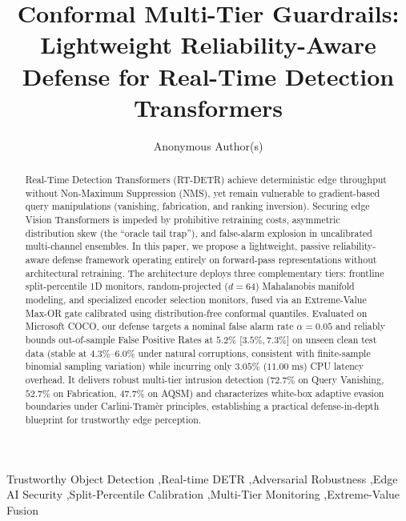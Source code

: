\documentclass[preprint,12pt]{elsarticle}
\begin{document}
\begin{frontmatter}

\title{\textbf{Conformal Multi-Tier Guardrails: Lightweight Reliability-Aware Defense for Real-Time Detection Transformers}}

\author{Anonymous Author(s)}

\begin{abstract}
Real-Time Detection Transformers (RT-DETR) achieve deterministic edge throughput without Non-Maximum Suppression (NMS), yet remain vulnerable to gradient-based query manipulations (vanishing, fabrication, and ranking inversion). Securing edge Vision Transformers is impeded by prohibitive retraining costs, asymmetric distribution skew (the ``oracle tail trap''), and false-alarm explosion in uncalibrated multi-channel ensembles. In this paper, we propose a lightweight, passive reliability-aware defense framework operating entirely on forward-pass representations without architectural retraining. The architecture deploys three complementary tiers: frontline split-percentile 1D monitors, random-projected ($d=64$) Mahalanobis manifold modeling, and specialized encoder selection monitors, fused via an Extreme-Value Max-OR gate calibrated using distribution-free conformal quantiles. Evaluated on Microsoft COCO, our defense targets a nominal false alarm rate $\alpha=0.05$ and reliably bounds out-of-sample False Positive Rates at $5.2\%$ [$3.5\%, 7.3\%$] on unseen clean test data (stable at $4.3\%$--$6.0\%$ under natural corruptions, consistent with finite-sample binomial sampling variation) while incurring only $3.05\%$ ($11.00\text{ ms}$) CPU latency overhead. It delivers robust multi-tier intrusion detection ($72.7\%$ on Query Vanishing, $52.7\%$ on Fabrication, $47.7\%$ on AQSM) and characterizes white-box adaptive evasion boundaries under Carlini-Tramèr principles, establishing a practical defense-in-depth blueprint for trustworthy edge perception.
\end{abstract}

\begin{keyword}
Trustworthy Object Detection \sep Real-time DETR \sep Adversarial Robustness \sep Edge AI Security \sep Split-Percentile Calibration \sep Multi-Tier Monitoring \sep Extreme-Value Fusion
\end{keyword}

\end{frontmatter}
\end{document}
